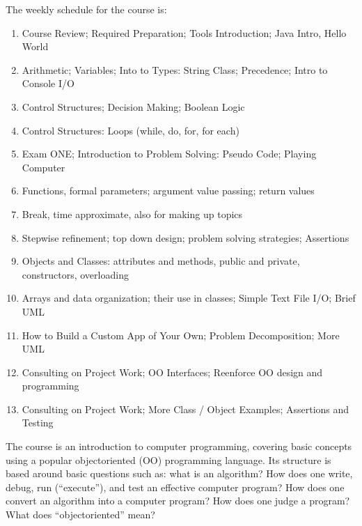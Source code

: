 \documentclass[letterpaper,10pt,english]{sphinxmanual}
\begin{document}
The  weekly schedule for the course is:
\begin{enumerate}
%
\item {} 
Course Review; Required Preparation; Tools Introduction;  Java Intro, Hello World

\item {} 
Arithmetic; Variables; Into to Types: String Class; Precedence; Intro to Console I/O

\item {} 
Control Structures; Decision Making; Boolean Logic

\item {} 
Control Structures: Loops (while, do, for, for each)

\item {} 
Exam ONE; Introduction to Problem Solving: Pseudo Code; Playing Computer

\item {} 
Functions, formal parameters; argument value passing; return values

\item {} 
Break, time approximate, also for making up topics

\item {} 
Stepwise refinement; top down design; problem solving strategies; Assertions

\item {} 
Objects and Classes: attributes and methods, public and private, constructors, overloading

\item {} 
Arrays and data organization; their use in classes; Simple Text File I/O; Brief UML

\item {} 
How to Build a Custom App of Your Own; Problem Decomposition; More UML

\item {} 
Consulting on Project Work; OO Interfaces; Reenforce OO design and programming

\item {} 
Consulting on Project Work; More Class / Object Examples; Assertions and Testing

\end{enumerate}

The course is an introduction to  computer programming, covering basic concepts using a popular object\sphinxhyphen{}oriented (OO) programming language. Its structure is based around basic questions such as: what is an algorithm? How does one write, debug, run (“execute”), and test an effective computer program? How does one convert an algorithm into a computer program? How does one judge a program? What does “object\sphinxhyphen{}oriented” mean?
\end{document}
